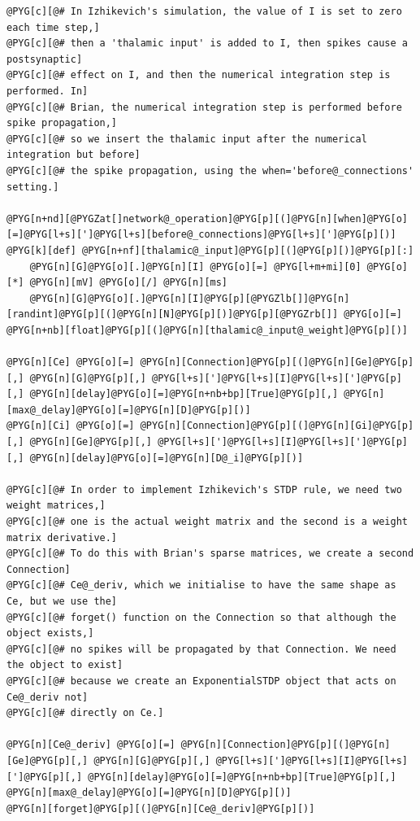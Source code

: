 \documentclass[letterpaper,10pt,english]{manual}
\begin{document}
\begin{Verbatim}[commandchars=@\[\]]
@PYG[c][@# In Izhikevich's simulation, the value of I is set to zero each time step,]
@PYG[c][@# then a 'thalamic input' is added to I, then spikes cause a postsynaptic]
@PYG[c][@# effect on I, and then the numerical integration step is performed. In]
@PYG[c][@# Brian, the numerical integration step is performed before spike propagation,]
@PYG[c][@# so we insert the thalamic input after the numerical integration but before]
@PYG[c][@# the spike propagation, using the when='before@_connections' setting.]

@PYG[n+nd][@PYGZat[]network@_operation]@PYG[p][(]@PYG[n][when]@PYG[o][=]@PYG[l+s][']@PYG[l+s][before@_connections]@PYG[l+s][']@PYG[p][)]
@PYG[k][def] @PYG[n+nf][thalamic@_input]@PYG[p][(]@PYG[p][)]@PYG[p][:]
    @PYG[n][G]@PYG[o][.]@PYG[n][I] @PYG[o][=] @PYG[l+m+mi][0] @PYG[o][*] @PYG[n][mV] @PYG[o][/] @PYG[n][ms]
    @PYG[n][G]@PYG[o][.]@PYG[n][I]@PYG[p][@PYGZlb[]]@PYG[n][randint]@PYG[p][(]@PYG[n][N]@PYG[p][)]@PYG[p][@PYGZrb[]] @PYG[o][=] @PYG[n+nb][float]@PYG[p][(]@PYG[n][thalamic@_input@_weight]@PYG[p][)]

@PYG[n][Ce] @PYG[o][=] @PYG[n][Connection]@PYG[p][(]@PYG[n][Ge]@PYG[p][,] @PYG[n][G]@PYG[p][,] @PYG[l+s][']@PYG[l+s][I]@PYG[l+s][']@PYG[p][,] @PYG[n][delay]@PYG[o][=]@PYG[n+nb+bp][True]@PYG[p][,] @PYG[n][max@_delay]@PYG[o][=]@PYG[n][D]@PYG[p][)]
@PYG[n][Ci] @PYG[o][=] @PYG[n][Connection]@PYG[p][(]@PYG[n][Gi]@PYG[p][,] @PYG[n][Ge]@PYG[p][,] @PYG[l+s][']@PYG[l+s][I]@PYG[l+s][']@PYG[p][,] @PYG[n][delay]@PYG[o][=]@PYG[n][D@_i]@PYG[p][)]

@PYG[c][@# In order to implement Izhikevich's STDP rule, we need two weight matrices,]
@PYG[c][@# one is the actual weight matrix and the second is a weight matrix derivative.]
@PYG[c][@# To do this with Brian's sparse matrices, we create a second Connection]
@PYG[c][@# Ce@_deriv, which we initialise to have the same shape as Ce, but we use the]
@PYG[c][@# forget() function on the Connection so that although the object exists,]
@PYG[c][@# no spikes will be propagated by that Connection. We need the object to exist]
@PYG[c][@# because we create an ExponentialSTDP object that acts on Ce@_deriv not]
@PYG[c][@# directly on Ce.]

@PYG[n][Ce@_deriv] @PYG[o][=] @PYG[n][Connection]@PYG[p][(]@PYG[n][Ge]@PYG[p][,] @PYG[n][G]@PYG[p][,] @PYG[l+s][']@PYG[l+s][I]@PYG[l+s][']@PYG[p][,] @PYG[n][delay]@PYG[o][=]@PYG[n+nb+bp][True]@PYG[p][,] @PYG[n][max@_delay]@PYG[o][=]@PYG[n][D]@PYG[p][)]
@PYG[n][forget]@PYG[p][(]@PYG[n][Ce@_deriv]@PYG[p][)]


\end{Verbatim}
\end{document}
